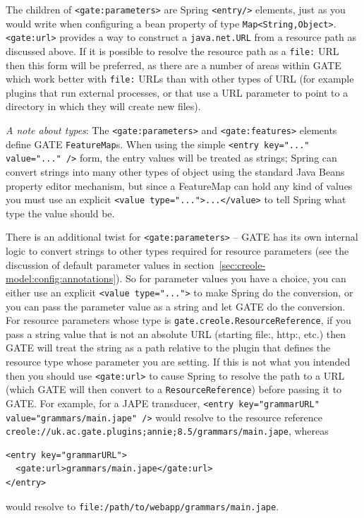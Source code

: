 The children of \verb|<gate:parameters>| are Spring \verb|<entry/>|
elements, just as you would write when configuring a bean property of
type \verb|Map<String,Object>|.  \verb|<gate:url>| provides a way to construct
a \verb|java.net.URL| from a resource path as discussed above.  If it is
possible to resolve the resource path as a \verb|file:| URL then this form will
be preferred, as there are a number of areas within GATE which work better with
\verb|file:| URLs than with other types of URL (for example plugins that run
external processes, or that use a URL parameter to point to a directory in
which they will create new files).

\emph{A note about types}: The \verb|<gate:parameters>| and
\verb|<gate:features>| elements define GATE \verb|FeatureMap|s.  When using the
simple \verb|<entry key="..." value="..." />| form, the entry values will be
treated as strings; Spring can convert strings into many other types of object
using the standard Java Beans property editor mechanism, but since a FeatureMap
can hold any kind of values you must use an explicit
\verb|<value type="...">...</value>| to tell Spring what type the value should
be.

There is an additional twist for \verb|<gate:parameters>| -- GATE has its own
internal logic to convert strings to other types required for resource
parameters (see the discussion of default parameter values in
section~\ref{sec:creole-model:config:annotations}).  So for parameter values you have a
choice, you can either use an explicit \verb|<value type="...">| to make Spring
do the conversion, or you can pass the parameter value as a string and let GATE
do the conversion.  For resource parameters whose type is
\verb|gate.creole.ResourceReference|, if you pass a string value that is not an
absolute URL (starting file:, http:, etc.) then GATE will treat the string as a
path relative to the plugin that defines the resource type whose parameter you
are setting.  If this is not what you intended then you should use
\verb|<gate:url>| to cause Spring to resolve the path to a URL (which GATE will
then convert to a \verb!ResourceReference!) before passing it to GATE.  For
example, for a JAPE transducer,
\verb|<entry key="grammarURL" value="grammars/main.jape" />| would resolve to
the resource reference
\verb!creole://uk.ac.gate.plugins;annie;8.5/grammars/main.jape!, whereas
%
\begin{small}\begin{verbatim}
<entry key="grammarURL">
  <gate:url>grammars/main.jape</gate:url>
</entry>
\end{verbatim}\end{small}
would resolve to \verb|file:/path/to/webapp/grammars/main.jape|.

